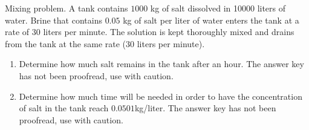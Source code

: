 Mixing problem. A tank contains $1000$ kg of salt dissolved in 10000 liters of water. Brine that contains $0.05$ kg of salt per liter of water enters the tank at a rate of $30$ liters per minute. The solution is kept thoroughly mixed and drains from the tank at the same rate ($30$ liters per minute). 


\begin{enumerate}
\item Determine how much salt remains in the tank after an hour. The answer key has not been proofread, use with caution.

\item Determine how much time will be needed in order to have the concentration of salt in the tank reach $0.0501$kg/liter. The answer key has not been proofread, use with caution.

\end{enumerate}
